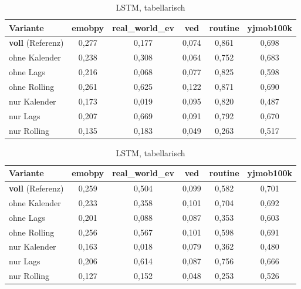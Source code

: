 \begin{table}[H]
    \vspace{1em}

    \begin{subtable}{\textwidth}
        \centering
        \caption{LightGBM}
        \label{tab:ablation_lgbm}
        \begin{tabular}{lccccc}
            \toprule
            \textbf{Variante} & emobpy & real\_world\_ev & ved & routine & yjmob100k \\
            \midrule
            \textbf{voll} (Referenz)     & 0,277 & 0,177 & 0,074 & 0,861 & 0,698 \\
            \addlinespace
            ohne Kalender                & 0,238 & 0,308 & 0,064 & 0,752 & 0,683 \\
            ohne Lags                    & 0,216 & 0,068 & 0,077 & 0,825 & 0,598 \\
            ohne Rolling                 & 0,261 & 0,625 & 0,122 & 0,871 & 0,690 \\
            \addlinespace
            nur Kalender                 & 0,173 & 0,019 & 0,095 & 0,820 & 0,487 \\
            nur Lags                     & 0,207 & 0,669 & 0,091 & 0,792 & 0,670 \\
            nur Rolling                  & 0,135 & 0,183 & 0,049 & 0,263 & 0,517 \\
            \bottomrule
        \end{tabular}
    \end{subtable}

    \vspace{1em}

    \begin{subtable}{\textwidth}
        \centering
        \caption{LSTM, tabellarisch}
        \label{tab:ablation_lstm_tab}
        \begin{tabular}{lccccc}
            \toprule
            \textbf{Variante} & emobpy & real\_world\_ev & ved & routine & yjmob100k \\
            \midrule
            \textbf{voll} (Referenz)     & 0,259 & 0,504 & 0,099 & 0,582 & 0,701 \\
            \addlinespace
            ohne Kalender                & 0,233 & 0,358 & 0,101 & 0,704 & 0,692 \\
            ohne Lags                    & 0,201 & 0,088 & 0,087 & 0,353 & 0,603 \\
            ohne Rolling                 & 0,256 & 0,567 & 0,101 & 0,598 & 0,691 \\
            \addlinespace
            nur Kalender                 & 0,163 & 0,018 & 0,079 & 0,362 & 0,480 \\
            nur Lags                     & 0,206 & 0,614 & 0,087 & 0,756 & 0,666 \\
            nur Rolling                  & 0,127 & 0,152 & 0,048 & 0,253 & 0,526 \\
            \bottomrule
        \end{tabular}
    \end{subtable}
\end{table}

